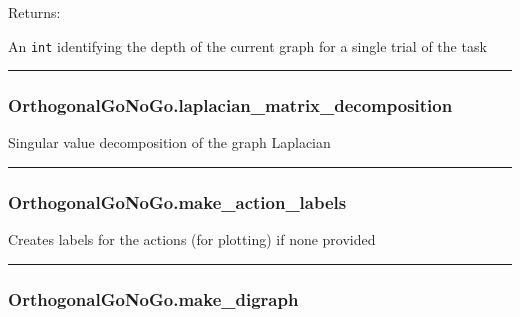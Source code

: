 Returns:

An \texttt{int} identifying the depth of the current graph for a single
trial of the task

\begin{center}\rule{0.5\linewidth}{\linethickness}\end{center}

\subsubsection{OrthogonalGoNoGo.laplacian\_matrix\_decomposition}\label{orthogonalgonogo.laplacian_matrix_decomposition}

\begin{Shaded}
\begin{Highlighting}[]
\NormalTok{)}
\end{Highlighting}
\end{Shaded}

Singular value decomposition of the graph Laplacian

\begin{center}\rule{0.5\linewidth}{\linethickness}\end{center}

\subsubsection{OrthogonalGoNoGo.make\_action\_labels}\label{orthogonalgonogo.make_action_labels}

\begin{Shaded}
\begin{Highlighting}[]
\NormalTok{)}
\end{Highlighting}
\end{Shaded}

Creates labels for the actions (for plotting) if none provided

\begin{center}\rule{0.5\linewidth}{\linethickness}\end{center}

\subsubsection{OrthogonalGoNoGo.make\_digraph}\label{orthogonalgonogo.make_digraph}

\begin{Shaded}
\begin{Highlighting}[]
\NormalTok{)}
\end{Highlighting}
\end{Shaded}

